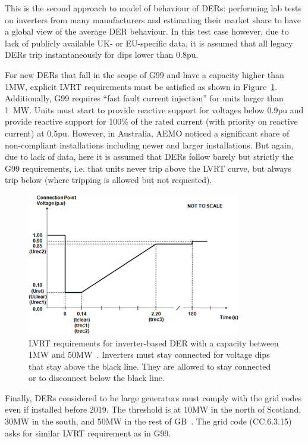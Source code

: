 This is the second approach to model of behaviour of DERs: performing lab tests on inverters from many manufacturers and estimating their market share to have a global view of the average DER behaviour. In this test case however, due to lack of publicly available UK- or EU-specific data, it is assumed that all legacy DERs trip instantaneously for dips lower than 0.8pu.

For new DERs that fall in the scope of G99 and have a capacity higher than 1MW, explicit LVRT requirements must be satisfied as shown in Figure~\ref{fig:G99_LVRT}. Additionally, G99 requires ``fast fault current injection'' for units larger than 1~MW. Units must start to provide reactive support for voltages below 0.9pu and provide reactive support for 100\% of the rated current (with priority on reactive current) at 0.5pu. However, in Australia, AEMO noticed a significant share of non-compliant installations including newer and larger installations. But again, due to lack of data, here it is assumed that DERs follow barely but strictly the G99 requirements, i.e. that units never trip above the LVRT curve, but always trip below (where tripping is allowed but not requested).

\begin{figure}
    \centering
    \includegraphics[width=0.7\linewidth]{Figs/G99_LVRT.png}
    \caption{LVRT requirements for inverter-based DER with a capacity between 1MW and 50MW~\cite{G99}. Inverters must stay connected for voltage dips that stay above the black line. They are allowed to stay connected or to disconnect below the black line.}
    \label{fig:G99_LVRT}
\end{figure}

Finally, DERs considered to be large generators must comply with the grid codes even if installed before 2019. The threshold is at 10MW in the north of Scotland, 30MW in the south, and 50MW in the rest of GB~\cite{GBConnectionConditions}. The grid code (CC.6.3.15) asks for similar LVRT requirement as in G99.

